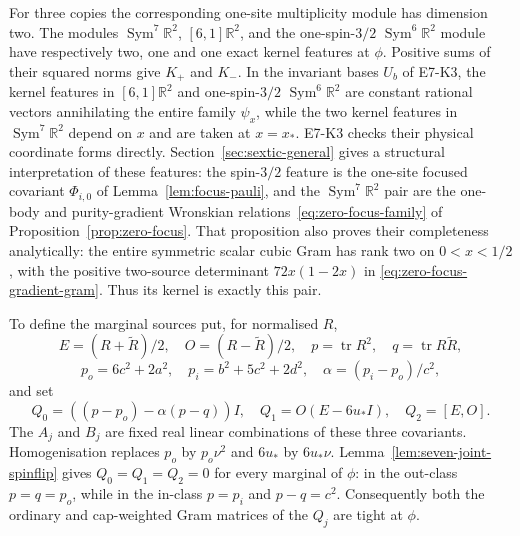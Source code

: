 For three copies the corresponding one-site multiplicity module has
dimension two. The modules $\operatorname{Sym}^7\mathbb R^2$,
$[6,1]\mathbb R^2$, and the one-spin-$3/2$
$\operatorname{Sym}^6\mathbb R^2$ module have respectively two, one and
one exact kernel features at $\phi$. Positive sums of their squared
norms give $K_+$ and $K_-$. In the invariant bases $U_b$ of E7-K3, the kernel
features in $[6,1]\mathbb R^2$ and one-spin-$3/2$ $\operatorname{Sym}^6\mathbb R^2$
are constant rational vectors annihilating the entire family $\psi_x$,
while the two kernel features in $\operatorname{Sym}^7\mathbb R^2$ depend on $x$
and are taken at $x=x_*$. E7-K3 checks their physical coordinate forms directly.
Section~\ref{sec:sextic-general} gives a structural interpretation of these features:
the spin-$3/2$ feature is the one-site focused covariant $\Phi_{i,0}$ of
Lemma~\ref{lem:focus-pauli}, and the $\operatorname{Sym}^7\mathbb R^2$ pair
are the one-body and purity-gradient Wronskian
relations~\eqref{eq:zero-focus-family} of Proposition~\ref{prop:zero-focus}.
That proposition also proves their completeness analytically: the entire
symmetric scalar cubic Gram has rank two on $0<x<1/2$, with the
positive two-source determinant $72x(1-2x)$ in
\eqref{eq:zero-focus-gradient-gram}. Thus its kernel is exactly this pair.

To define the marginal sources put, for normalised $R$,
\[
 E=(R+\widetilde R)/2,\quad O=(R-\widetilde R)/2,\quad
 p=\operatorname{tr}R^2,\quad q=\operatorname{tr}R\widetilde R,
\]
\[
 p_o=6c^2+2a^2,\quad p_i=b^2+5c^2+2d^2,\quad
 \alpha=(p_i-p_o)/c^2,
\]
and set
\[
 Q_0=((p-p_o)-\alpha(p-q))I,\quad
 Q_1=O(E-6u_*I),\quad Q_2=[E,O].
\]
The $A_j$ and $B_j$ are fixed real linear combinations of these three
covariants. Homogenisation replaces $p_o$ by $p_o\nu^2$ and $6u_*$ by
$6u_*\nu$. Lemma~\ref{lem:seven-joint-spinflip} gives
$Q_0=Q_1=Q_2=0$ for every marginal of $\phi$: in the out-class
$p=q=p_o$, while in the in-class $p=p_i$ and $p-q=c^2$.
Consequently both the ordinary and cap-weighted Gram matrices of the
$Q_j$ are tight at $\phi$.

